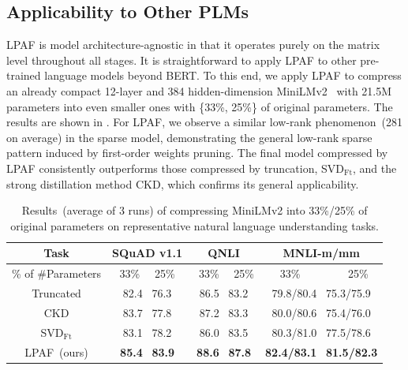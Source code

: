 \subsection{Applicability to Other PLMs}
LPAF is model architecture-agnostic in that it operates purely on the 
matrix level throughout all stages. It is straightforward to apply LPAF to other pre-trained language models beyond BERT. To this end, we apply  LPAF to compress an already compact 12-layer and 384 hidden-dimension MiniLMv2~\cite{minilm} with 21.5M parameters into even smaller ones with \{33\%, 25\%\} of original parameters. The results are shown in . For LPAF, we observe a similar low-rank phenomenon~(281 on average) in the sparse model, demonstrating the general low-rank sparse pattern induced by first-order weights pruning. The final model compressed by LPAF consistently outperforms those compressed by truncation, SVD$_{\text{Ft}}$, and the strong distillation method CKD, which confirms its general applicability.
\begin{table}[h]
	\centering
	\scriptsize
	\begin{tabular}{|c|ccc|}
		\hline
		Task & SQuAD v1.1   & QNLI     & MNLI-m/mm         \\
		\hline
		\% of \#Parameters &33\%  ~~25\%            &~33\%  ~~25\%             &~33\%  ~~~~~~~~25\%          \\
		\hline
		Truncated       & 82.4 ~76.3          & 86.5~ 83.2          & 79.8/80.4~ 75.3/75.9         \\
		CKD       & 83.7 ~77.8          & 87.2~ 83.3          & 80.0/80.6~ 75.4/76.0         \\
		
		\hline
		SVD$_{\text{Ft}}$           & 83.1 ~78.2          & 86.0~ 83.5          & 80.3/81.0~ 77.5/78.6         \\
		LPAF~(ours)                  &\textbf{85.4} ~\textbf{83.9}          & \textbf{88.6}~ \textbf{87.8}          & \textbf{82.4/83.1}~ \textbf{81.5/82.3}           \\
		\hline
	\end{tabular}
	\caption{Results~(average of 3 runs) of compressing MiniLMv2 into 33\%/25\% of original parameters on representative natural language understanding tasks.}
	\label{table:roberta}
\end{table}



